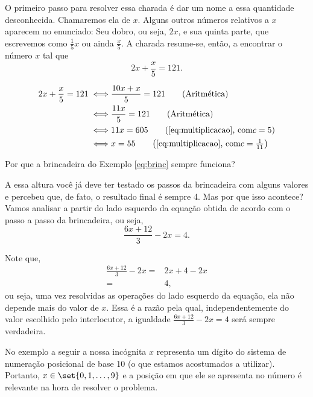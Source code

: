 \begin{solution}
O primeiro passo para resolver essa charada é dar um nome a essa quantidade desconhecida. Chamaremos ela de $x$. Alguns outros números relativos a $x$ aparecem no enunciado: Seu dobro, ou seja, $2x$, e sua quinta parte, que escrevemos como $\frac{1}{5}x$ ou ainda $\frac{x}{5}$. A charada resume-se, então, a encontrar o número $x$ tal que $$2x + \frac{x}{5}  = 121.$$

\begin{align*}
	2x + \frac{x}{5}  = 121 \iff & \frac{10x + x}{5}  = 121 \tag*{(Aritmética)}\\ 
		 \iff & \frac{11x}{5}  = 121 \tag*{(Aritmética)}\\ 
		 \iff & 11x = 605 \tag*{$\left(\text{\ref{eq:multiplicacao}, com} c = 5 \right) $}\\
		 \iff & x = 55 \tag*{$\left(\text{\ref{eq:multiplicacao}, com} c = \frac 1 {11} \right) $}
\end{align*}
\end{solution}

\begin{example}
	Por que a brincadeira do Exemplo \ref{eq:brinc} sempre funciona?
\end{example}

\begin{solution}
	A essa altura você já deve ter testado os passos da brincadeira com alguns valores e percebeu que, de fato, o resultado final é sempre 4. Mas por que isso acontece? Vamos analisar a partir do lado esquerdo da equação obtida de acordo com o passo a passo da brincadeira, ou seja, $$\frac{6x+12}{3} - 2x = 4.$$

	Note que,
	\begin{align*}
		\frac{6x+12}{3} - 2x = & 2x + 4 - 2x  \tag*{(Aritmética)}\\ 
			= & 4, \tag*{(Aritmética)}		
	\end{align*}
	ou seja, uma vez resolvidas as operações do lado esquerdo da equação, ela não depende mais do valor de $x$. Essa é a razão pela qual, independentemente do valor escolhido pelo interlocutor, a igualdade $\frac{6x+12}{3} - 2x = 4$ será sempre verdadeira.
\end{solution}

No exemplo a seguir a nossa incógnita $x$ representa um dígito do sistema de numeração posicional de base 10 (o que estamos acostumados a utilizar). Portanto, $x \in \set{0,1,\ldots, 9}$ e a posição em que ele se apresenta no número é relevante na hora de resolver o problema. 


